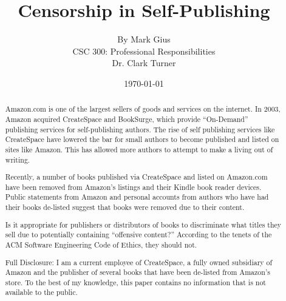 \documentclass[11pt]{article}
\begin{document}
\title{\vfill Censorship in Self-Publishing} %
\author{
By Mark Gius\vspace{10pt} \\ 
CSC 300: Professional Responsibilities\vspace{10pt} \\ 
Dr. Clark Turner\vspace{10pt} \\ 
}
\date{\today}

\maketitle

\vfill  %
\begin{abstract}
Amazon.com is one of the largest sellers of goods and services on the internet.  In 2003, Amazon acquired CreateSpace and BookSurge, which provide ``On-Demand'' publishing services for self-publishing authors. The rise of self publishing services like CreateSpace have lowered the bar for small authors to become published and listed on sites like Amazon. This has allowed more authors to attempt to make a living out of writing.

Recently, a number of books published via CreateSpace and listed on Amazon.com have been removed from Amazon's listings and their Kindle book reader devices.  Public statements from Amazon and personal accounts from authors who have had their books de-listed suggest that books were removed due to their content. 

Is it appropriate for publishers or distributors of books to discriminate what titles they sell due to potentially containing ``offensive content?''  According to the tenets of the ACM Software Engineering Code of Ethics, they should not. 

\vfill

Full Disclosure: I am a current employee of CreateSpace, a fully owned subsidiary of Amazon and the publisher of several books that have been de-listed from Amazon's store. To the best of my knowledge, this paper contains no information that is not available to the public.
\end{abstract}

\thispagestyle{empty} %
\newpage

\thispagestyle{empty}  %
\tableofcontents
\end{document}
